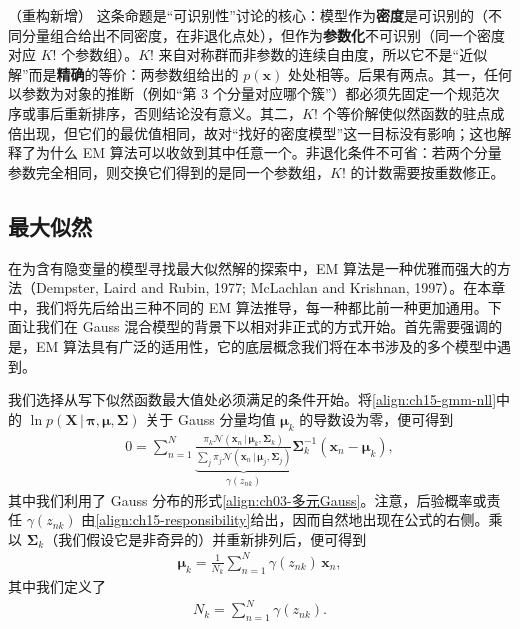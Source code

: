 \documentclass[../../main.tex]{subfiles}
\begin{document}
\begin{remark}（重构新增）
这条命题是“可识别性”讨论的核心：模型作为\textbf{密度}是可识别的（不同分量组合给出不同密度，在非退化点处），但作为\textbf{参数化}不可识别（同一个密度对应 $K!$ 个参数组）。$K!$ 来自对称群而非参数的连续自由度，所以它不是“近似解”而是\textbf{精确}的等价：两参数组给出的 $p(\bm{x})$ 处处相等。后果有两点。其一，任何以参数为对象的推断（例如“第 3 个分量对应哪个簇”）都必须先固定一个规范次序或事后重新排序，否则结论没有意义。其二，$K!$ 个等价解使似然函数的驻点成倍出现，但它们的最优值相同，故对“找好的密度模型”这一目标没有影响；这也解释了为什么 EM 算法可以收敛到其中任意一个。非退化条件不可省：若两个分量参数完全相同，则交换它们得到的是同一个参数组，$K!$ 的计数需要按重数修正。
\end{remark}

\subsection{最大似然}\label{subsection:ch15-最大似然}

在为含有隐变量的模型寻找最大似然解的探索中，EM 算法是一种优雅而强大的方法（Dempster, Laird and Rubin, 1977; McLachlan and Krishnan, 1997）。在本章中，我们将先后给出三种不同的 EM 算法推导，每一种都比前一种更加通用。下面让我们在 Gauss 混合模型的背景下以相对非正式的方式开始。首先需要强调的是，EM 算法具有广泛的适用性，它的底层概念我们将在本书涉及的多个模型中遇到。

我们选择从写下似然函数最大值处必须满足的条件开始。将\eqref{align:ch15-gmm-nll}中的 $\ln p(\bm{X}\,|\,\bm{\pi},\bm{\mu},\bm{\Sigma})$ 关于 Gauss 分量均值 $\bm{\mu}_k$ 的导数设为零，便可得到
\begin{align}
0=\sum_{n=1}^{N}\underbrace{\frac{\pi_k\mathcal{N}(\bm{x}_n\,|\,\bm{\mu}_k,\bm{\Sigma}_k)}{\sum_j\pi_j\mathcal{N}(\bm{x}_n\,|\,\bm{\mu}_j,\bm{\Sigma}_j)}}_{\gamma(z_{nk})}\bm{\Sigma}_k^{-1}(\bm{x}_n-\bm{\mu}_k),
\label{align:ch15-mu-deriv}
\end{align}
其中我们利用了 Gauss 分布的形式\eqref{align:ch03-多元Gauss}。注意，后验概率或责任 $\gamma(z_{nk})$ 由\eqref{align:ch15-responsibility}给出，因而自然地出现在公式的右侧。乘以 $\bm{\Sigma}_k$（我们假设它是非奇异的）并重新排列后，便可得到
\begin{align}
\bm{\mu}_k=\frac{1}{N_k}\sum_{n=1}^{N}\gamma(z_{nk})\,\bm{x}_n,
\label{align:ch15-mu-update}
\end{align}
其中我们定义了
\begin{align}
N_k=\sum_{n=1}^{N}\gamma(z_{nk}).
\label{align:ch15-effective-n}
\end{align}
\end{document}
